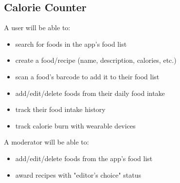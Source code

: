 \subsection{Calorie Counter}
A user will be able to:
\begin{itemize}
  \item search for foods in the app's food list
  \item create a food/recipe (name, description, calories, etc.)
  \item scan a food's barcode to add it to their food list
  \item add/edit/delete foods from their daily food intake
  \item track their food intake history
  \item track calorie burn with wearable devices
\end{itemize}
A moderator will be able to:
\begin{itemize}
  \item add/edit/delete foods from the app's food list
  \item award recipes with "editor's choice" status
\end{itemize}

\clearpage